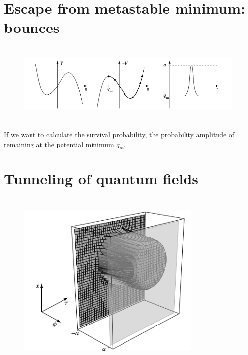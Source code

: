 \documentclass[a4paper, 12pt]{article}
\begin{document}
\section {Escape from metastable minimum: bounces}
\begin{figure}[ht]
    \centering
    \includegraphics[height=4cm, width=15cm]{fig5}
\end{figure}
If we want to calculate the survival probability, the probability amplitude of remaining at the potential minimum $q_m$.


\section {Tunneling of quantum fields}

\begin{figure}[ht]
    \centering
    \includegraphics[height=9cm, width=9cm]{fig6}
\end{figure}
\end{document}
